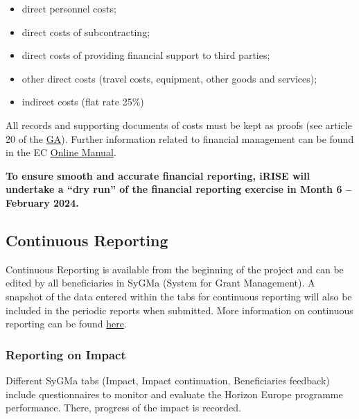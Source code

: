 \documentclass[
]{article}
\providecommand{\tightlist}{%
  \setlength{\itemsep}{0pt}\setlength{\parskip}{0pt}}
\begin{document}
\begin{itemize}
\tightlist
\item
  direct personnel costs;\\
\item
  direct costs of subcontracting;\\
\item
  direct costs of providing financial support to third parties;\\
\item
  other direct costs (travel costs, equipment, other goods and services);\\
\item
  indirect costs (flat rate 25\%)
\end{itemize}

All records and supporting documents of costs must be kept as proofs (see article 20 of the \href{https://charitede.sharepoint.com/:f:/r/sites/iRISE/Shared\%20Documents/General/Grant\%20Agreement/AMD-101094853-4_Nov2023?csf=1\&web=1\&e=IRbwUs}{GA}). Further information related to financial management can be found in the EC \href{https://webgate.ec.europa.eu/funding-tenders-opportunities/display/OM/Online+Manual}{Online Manual}.

\textbf{To ensure smooth and accurate financial reporting, iRISE will undertake a ``dry run'' of the financial reporting exercise in Month 6 -- February 2024.}

\hypertarget{continuous-reporting}{%
\subsection{Continuous Reporting}\label{continuous-reporting}}

Continuous Reporting is available from the beginning of the project and can be edited by all beneficiaries in SyGMa (System for Grant Management). A snapshot of the data entered within the tabs for continuous reporting will also be included in the periodic reports when submitted. More information on continuous reporting can be found \href{https://webgate.ec.europa.eu/funding-tenders-opportunities/display/IT/Continuous+Reporting}{here}.

\hypertarget{reporting-on-impact}{%
\subsubsection{Reporting on Impact}\label{reporting-on-impact}}

Different SyGMa tabs (Impact, Impact continuation, Beneficiaries feedback) include questionnaires to monitor and evaluate the Horizon Europe programme performance. There, progress of the impact is recorded.
\end{document}
